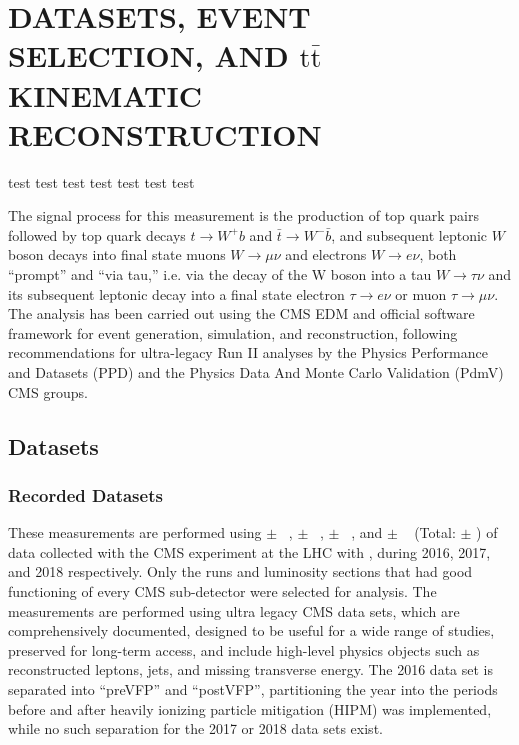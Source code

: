 
\chapter{DATASETS, EVENT SELECTION, AND \ensuremath{\mathrm{t\bar{t}}} KINEMATIC RECONSTRUCTION}
\label{Datasets_Event_Selection_Kinematic_Reconstruction}

\begin{cabstract}
test test test test test test test
\end{cabstract}

The signal process for this measurement is the production of top quark pairs followed by top quark decays $t\to W^+ b$ and $\bar{t}\to W^- \bar{b}$, and subsequent leptonic $W$ boson decays into final state muons $W\to \mu\nu$ and electrons $W\to e\nu$, both ``prompt'' and ``via tau,'' i.e. via the decay of the W boson into a tau $W\to \tau\nu$ and its subsequent leptonic decay into a final state electron $\tau\to e\nu$ or muon $\tau\to \mu\nu$.
The analysis has been carried out using the CMS EDM and official software framework for event generation, simulation, and reconstruction, following recommendations for ultra-legacy Run II analyses by the Physics Performance and Datasets (PPD) and the Physics Data And Monte Carlo Validation (PdmV) CMS groups.

\section{Datasets}

\subsection{Recorded Datasets}
These measurements are performed using \lumivalueSixPreVFP $\pm$ \lumierrSixPreVFP~\cite{bib:lumipas16}, \lumivalueSixPostVFP $\pm$ \lumierrSixPostVFP~\cite{bib:lumipas16}, \lumivalueSeven $\pm$ \lumierrSeven~\cite{bib:lumipas17}, and \lumivalueEight $\pm$ \lumierrEight~\cite{bib:lumipas18} (Total: \lumivalueRuniiUL $\pm$ \lumierrRuniiUL) of data collected with the CMS experiment at the LHC with \beamenergy, during 2016, 2017, and 2018 respectively.
Only the runs and luminosity sections that had good functioning of every CMS sub-detector were selected for analysis.
The measurements are performed using ultra legacy CMS data sets, which are comprehensively documented, designed to be useful for a wide range of studies, preserved for long-term access, and include high-level physics objects such as reconstructed leptons, jets, and missing transverse energy.
The 2016 data set is separated into ``preVFP'' and ``postVFP'', partitioning the year into the periods before and after heavily ionizing particle mitigation (HIPM) was implemented, while no such separation for the 2017 or 2018 data sets exist.

